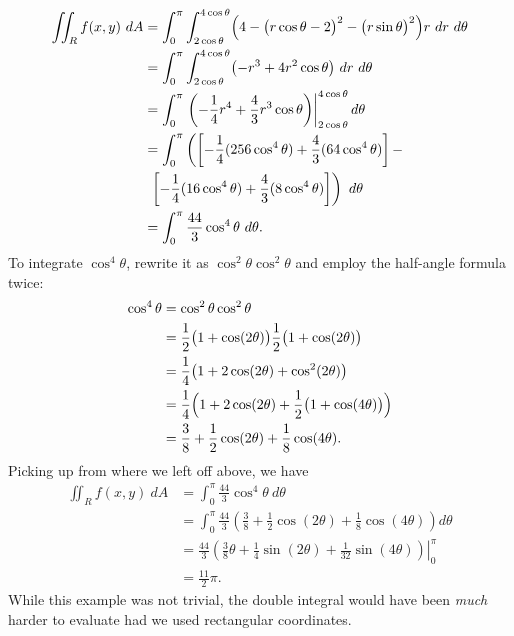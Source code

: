 \begin{example}
\begin{align*}
\iint_Rf(x,y)\ dA
	&= \int_0^{\pi}\int_{2\cos\theta}^{4\cos\theta} \Bigl(4-\bigl(r\cos\theta-2\bigr)^2-\bigl(r\sin\theta\bigr)^2\Bigr)r\ dr\ d\theta\\
	&= \int_0^{\pi}\int_{2\cos\theta}^{4\cos\theta} \bigl(-r^3+4r^2\cos \theta\bigr)\ dr\ d\theta\\
	&= \int_0^\pi \left.\left(-\frac14r^4+\frac43r^3\cos\theta\right)\right|_{2\cos\theta}^{4\cos\theta}d\theta\\
	&=\int_0^\pi \left(\left[-\frac14(256\cos^4\theta)+\frac43(64\cos^4\theta)\right]-\right.\\
	&\ \left.\left[-\frac14(16\cos^4\theta)+\frac43(8\cos^4\theta)\right]\right)\ d\theta\\
	&=\int_0^\pi\frac{44}3\cos^4\theta\ d\theta.
\end{align*}
To integrate $\cos^4\theta$, rewrite it as $\cos^2\theta\cos^2\theta$ and employ the half-angle formula twice:
\begin{align*}
	\cos^4\theta &=\cos^2\theta\cos^2\theta\\
	&= \frac12\bigl(1+\cos(2\theta)\bigr)\frac12\bigl(1+\cos(2\theta)\bigr) \\
	&= \frac14\bigl(1+2\cos(2\theta)+\cos^2(2\theta)\bigr)\\
	&=\frac14\Bigl(1+2\cos(2\theta)+\frac12\bigl(1+\cos(4\theta)\bigr)\Bigr)\\
	&= \frac38+\frac12\cos(2\theta)+\frac18\cos(4\theta).
\end{align*}
Picking up from where we left off above, we have
\begin{align*}
\iint_Rf(x,y)\ dA &=\int_0^\pi\frac{44}3\cos^4\theta\ d\theta\\
	&=\int_0^\pi \frac{44}3\left(\frac38+\frac12\cos(2\theta)+\frac18\cos(4\theta)\right)d\theta\\
	&= \left.\frac{44}3\left(\frac{3}8\theta+\frac14\sin(2\theta)+\frac{1}{32}\sin(4\theta)\right)\right|_0^\pi\\
	&=\frac{11}2\pi%
	.
\end{align*}
While this example was not trivial, the double integral would have been \emph{much} harder to evaluate had we used rectangular coordinates.
\end{example}


